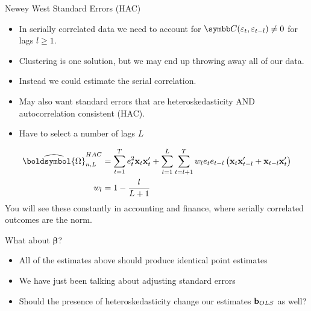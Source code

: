\documentclass[aspectratio=169,11pt]{beamer}
\begin{document}
\begin{frame}{Newey West Standard Errors (HAC)}
\begin{itemize}
\item In serially correlated data we need to account for $\Cov (\varepsilon_{t},\varepsilon_{t-l}) \neq 0$ for lags $l \ge 1$.
\item Clustering is one solution, but we may end up throwing away all of our data.
\item Instead we could estimate the serial correlation.
\item May also want standard errors that are \alert{heteroskedasticity AND autocorrelation consistent} (HAC).
\item Have to select a number of lags $L$
\end{itemize}
\begin{align*}
\widehat { \boldsymbol{\Omega} } _ { n,L }^{HAC} &= \sum _ { t = 1 } ^ { T }  e _ { t }^2 {\bf x}_t {\bf x}_t'  + \sum_{l=1}^L \sum _ { t = l+1 } ^ { T } w_l e_t e _ { t-l } \left( {\bf x}_t {\bf x}_{t-l}' +  {\bf x}_{t-l} {\bf x}_{t}'  \right)\\
w_l &= 1 - \frac{l}{L+1}
\end{align*}
You will see these constantly in accounting and finance, where serially correlated
outcomes are the norm.
\end{frame}


\begin{frame}{What about $\boldsymbol{\beta}$?}
\begin{itemize}
\item All of the estimates above should produce \alert{identical} point estimates
\item We have just been talking about adjusting \alert{standard errors}
\item Should the presence of heteroskedasticity change our estimates ${\bf b}_{OLS}$ as well?
\end{itemize}
\end{frame}
\end{document}
